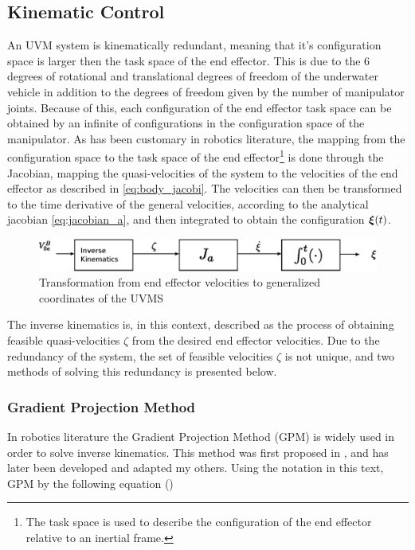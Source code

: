 \subsection{Kinematic Control}
An UVM system is kinematically redundant, meaning that it's configuration space is larger then the task space of the end effector. This is due to the 6 degrees of rotational and translational degrees of freedom of the underwater vehicle in addition to the degrees of freedom given by the number of manipulator joints. Because of this, each configuration of the end effector task space can be obtained by an infinite of configurations in the configuration space of the manipulator. 
As has been customary in robotics literature, the mapping from the configuration space to the task space of the end effector\footnote{The task space is used to describe the configuration of the end effector relative to an inertial frame.} is done through the Jacobian, mapping the quasi-velocities of the system to the velocities of the end effector as described in \eqref{eq:body_jacobi}. The velocities can then be transformed to the time derivative of the general 
velocities, according to the analytical jacobian \eqref{eq:jacobian_a}, and then integrated to obtain the configuration $\boldsymbol \xi(t)$.

\begin{figure}[h!]
	\centering
	\includegraphics[scale=0.7]{./figures/inverse-kinematics1.eps}
	\caption{Transformation from end effector velocities to generalized coordinates of the UVMS}
	\label{fig:inverse1}
\end{figure}
The inverse kinematics is, in this context, described as the process of obtaining feasible quasi-velocities $\zeta$ from the desired end effector velocities. Due to the redundancy of the system, the set of feasible velocities $\zeta$ is not unique, and two methods of solving this redundancy is presented below.  


\subsubsection{Gradient Projection Method}
In robotics literature the Gradient Projection Method (GPM) is widely used in order to solve inverse kinematics. This method was first proposed in \cite{Liegeois1977}, and has later been developed and adapted my others.
Using the notation in this text, GPM by the following equation (\cite{Liegeois1977})

